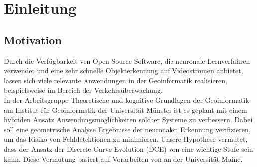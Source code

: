 \chapter{Einleitung}
\label{ch:intro}


\section{Motivation}{ 
	
Durch die Verfügbarkeit von Open-Source Software, die neuronale Lernverfahren verwendet und eine sehr schnelle Objekterkennung auf Videoströmen anbietet, lassen sich viele relevante Anwendungen in der Geoinformatik realisieren, beispielsweise im Bereich der Verkehrsüberwachung. \\
In der Arbeitsgruppe \glqq Theoretische und kognitive Grundlagen der Geoinformatik \grqq{} am Institut für Geoinformatik der Universität Münster ist es geplant mit einem hybriden Ansatz Anwendungsmöglichkeiten solcher Systeme zu verbessern. Dabei soll eine geometrische Analyse Ergebnisse der neuronalen Erkennung verifizieren, um das Risiko von Fehldetektionen zu minimieren. Unsere Hypothese vermutet, dass der Ansatz der Discrete Curve Evolution (DCE) von \citet{Latecki1999a}  eine wichtige Stufe sein kann. Diese Vermutung basiert auf Vorarbeiten von \citet*{Dorr2015} an der Universität Maine.
}


